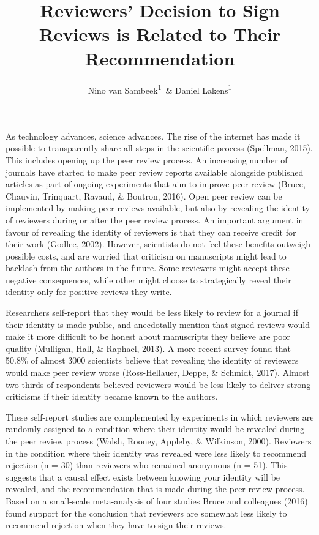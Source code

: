 \documentclass[
  english,
  ,jou, a4paper,floatsintext]{apa6}
\author{Nino van Sambeek\textsuperscript{1}\ \& Daniel Lakens\textsuperscript{1}}
\affiliation{
\vspace{0.5cm}
\textsuperscript{1} Eindhoven University of Technology, The Netherlands}
\title{Reviewers' Decision to Sign Reviews is Related to Their Recommendation}
\date{}
\begin{document}
\maketitle

As technology advances, science advances. The rise of the internet has made it possible to transparently share all steps in the scientific process (Spellman, 2015). This includes opening up the peer review process. An increasing number of journals have started to make peer review reports available alongside published articles as part of ongoing experiments that aim to improve peer review (Bruce, Chauvin, Trinquart, Ravaud, \& Boutron, 2016). Open peer review can be implemented by making peer reviews available, but also by revealing the identity of reviewers during or after the peer review process. An important argument in favour of revealing the identity of reviewers is that they can receive credit for their work (Godlee, 2002). However, scientists do not feel these benefits outweigh possible costs, and are worried that criticism on manuscripts might lead to backlash from the authors in the future. Some reviewers might accept these negative consequences, while other might choose to strategically reveal their identity only for positive reviews they write.

Researchers self-report that they would be less likely to review for a journal if their identity is made public, and anecdotally mention that signed reviews would make it more difficult to be honest about manuscripts they believe are poor quality (Mulligan, Hall, \& Raphael, 2013). A more recent survey found that 50.8\% of almost 3000 scientists believe that revealing the identity of reviewers would make peer review worse (Ross-Hellauer, Deppe, \& Schmidt, 2017). Almost two-thirds of respondents believed reviewers would be less likely to deliver strong criticisms if their identity became known to the authors.

These self-report studies are complemented by experiments in which reviewers are randomly assigned to a condition where their identity would be revealed during the peer review process (Walsh, Rooney, Appleby, \& Wilkinson, 2000). Reviewers in the condition where their identity was revealed were less likely to recommend rejection (n = 30) than reviewers who remained anonymous (n = 51). This suggests that a causal effect exists between knowing your identity will be revealed, and the recommendation that is made during the peer review process. Based on a small-scale meta-analysis of four studies Bruce and colleagues (2016) found support for the conclusion that reviewers are somewhat less likely to recommend rejection when they have to sign their reviews.
\end{document}
